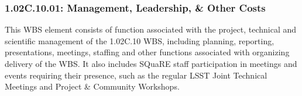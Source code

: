 \subsubsection*{1.02C.10.01: Management, Leadership, \& Other Costs}

This WBS element consists of function associated with the project, technical
and scientific management of the 1.02C.10 WBS, including planning, reporting,
presentations, meetings, staffing and other functions associated with
organizing delivery of the WBS. It also includes SQuaRE staff participation in
meetings and events requiring their presence, such as the regular LSST Joint
Technical Meetings and Project \& Community Workshops.

